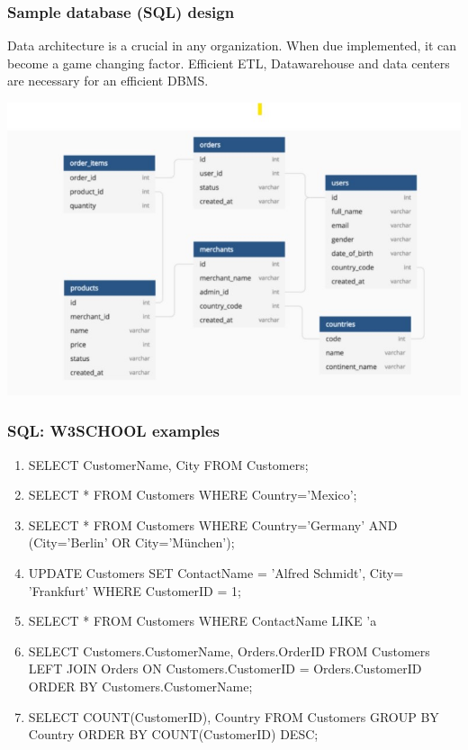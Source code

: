 \documentclass{beamer}
\begin{document}
\begin{frame}
    \centering
    \frametitle{Sample database (SQL) design}
    \begin{flushleft}
        Data architecture is a crucial in any organization. When due implemented, it can become a game changing factor. Efficient ETL, Datawarehouse and 
        data centers are necessary for an efficient DBMS.        
    \end{flushleft}
    \includegraphics[scale=0.5]{figures/db_design.jpg}
\end{frame}

\begin{frame}
    \frametitle{SQL: W3SCHOOL examples}
    \begin{enumerate}
\tiny        \item SELECT CustomerName, City FROM Customers; 
        \item SELECT * FROM Customers
        WHERE Country='Mexico';
        \item SELECT * FROM Customers
        WHERE Country='Germany' AND (City='Berlin' OR City='München');
        \item UPDATE Customers
        SET ContactName = 'Alfred Schmidt', City= 'Frankfurt'
        WHERE CustomerID = 1;
        \item SELECT * FROM Customers
        WHERE ContactName LIKE 'a%
        \item SELECT Customers.CustomerName, Orders.OrderID
        FROM Customers
        LEFT JOIN Orders ON Customers.CustomerID = Orders.CustomerID
        ORDER BY Customers.CustomerName;
        \item SELECT COUNT(CustomerID), Country
        FROM Customers
        GROUP BY Country
        ORDER BY COUNT(CustomerID) DESC;
    \end{enumerate}
\end{frame}
\end{document}
